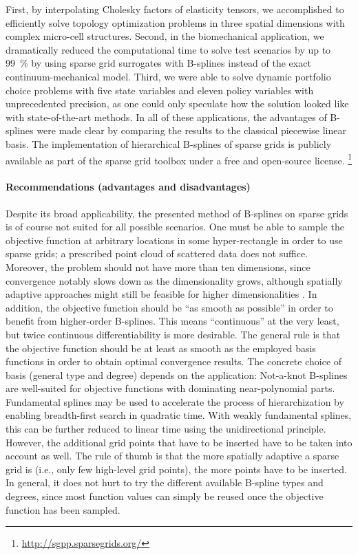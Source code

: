 First, by interpolating Cholesky factors of elasticity tensors,
we accomplished to efficiently solve
topology optimization problems in three spatial dimensions
with complex micro-cell structures.
Second, in the biomechanical application,
we dramatically reduced the computational time to solve
test scenarios by up to \SI{99}{\percent} by using
sparse grid surrogates with B-splines instead of the
exact continuum-mechanical model.
Third, we were able to solve dynamic portfolio choice problems
with five state variables and eleven policy variables
with unprecedented precision, as one could only speculate
how the solution looked like with state-of-the-art methods.
In all of these applications, the advantages of B-splines were made clear
by comparing the results to the classical piecewise linear basis.
The implementation of hierarchical B-splines of sparse grids is
publicly available as part of the sparse grid toolbox \sgpp
under a free and open-source license.%
\footnote{%
  \url{http://sgpp.sparsegrids.org/}%
}

\vspace*{\fill}
\pagebreak

\paragraph{Recommendations (advantages and disadvantages)}

Despite its broad applicability,
the presented method of B-splines on sparse grids is of course
not suited for all possible scenarios.
One must be able to sample the objective function at arbitrary
locations in some hyper-rectangle in order to use sparse grids;
a prescribed point cloud of scattered data does not suffice.
Moreover, the problem should not have more than ten dimensions,
since convergence notably slows down as the dimensionality grows,
although spatially adaptive approaches might still be feasible for
higher dimensionalities \cite{Pflueger10Spatially}.
In addition, the objective function should be ``as smooth as possible''
in order to benefit from higher-order B-splines.
This means ``continuous'' at the very least,
but twice continuous differentiability is more desirable.
The general rule is that the objective function should be
at least as smooth as the employed basis functions in order to obtain
optimal convergence results.
The concrete choice of basis (general type and degree) depends
on the application:
Not-a-knot B-splines are well-suited for objective functions with
dominating near-polynomial parts.
Fundamental splines may be used to accelerate the process of
hierarchization by enabling breadth-first search in quadratic time.
With weakly fundamental splines, this can be further reduced to
linear time using the unidirectional principle.
However, the additional grid points that have to be inserted
have to be taken into account as well.
The rule of thumb is that the more spatially adaptive a sparse grid is
(i.e., only few high-level grid points),
the more points have to be inserted.
In general, it does not hurt to try the different available
B-spline types and degrees,
since most function values can simply be reused
once the objective function has been sampled.

